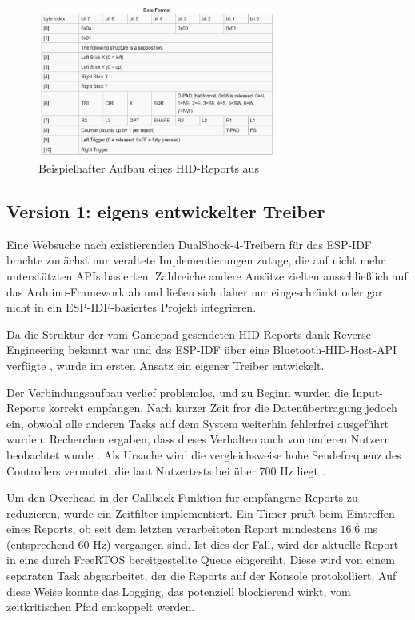 \begin{figure}[ht]
    \centering
    \includegraphics[width=0.7\textwidth]{images/becker_esp32_ds4_report.png}
    \caption{Beispielhafter Aufbau eines HID-Reports aus \cite{esp_ds4_hid_reports}}
\end{figure}

\subsection{Version 1: eigens entwickelter Treiber}

Eine Websuche nach existierenden DualShock-4-Treibern für das ESP-IDF brachte zunächst nur veraltete Implementierungen zutage, die auf nicht mehr unterstützten APIs basierten. 
Zahlreiche andere Ansätze zielten ausschließlich auf das Arduino-Framework ab und ließen sich daher nur eingeschränkt oder gar nicht in ein ESP-IDF-basiertes Projekt integrieren.

Da die Struktur der vom Gamepad gesendeten HID-Reports dank Reverse Engineering bekannt war und das ESP-IDF über eine Bluetooth-HID-Host-API verfügte \cite{esp_hib_bt_api}, wurde im ersten Ansatz ein eigener Treiber entwickelt.

Der Verbindungsaufbau verlief problemlos, und zu Beginn wurden die Input-Reports korrekt empfangen. 
Nach kurzer Zeit fror die Datenübertragung jedoch ein, obwohl alle anderen Tasks auf dem System weiterhin fehlerfrei ausgeführt wurden. 
Recherchen ergaben, dass dieses Verhalten auch von anderen Nutzern beobachtet wurde \cite{esp_hib_bt_api_issues}. 
Als Ursache wird die vergleichsweise hohe Sendefrequenz des Controllers vermutet, die laut Nutzertests bei über 700 Hz liegt \cite{esp_ds4_hid_reports}.

Um den Overhead in der Callback-Funktion für empfangene Reports zu reduzieren, wurde ein Zeitfilter implementiert. 
Ein Timer prüft beim Eintreffen eines Reports, ob seit dem letzten verarbeiteten Report mindestens $16.\overline{6}$ ms (entsprechend 60 Hz) vergangen sind. 
Ist dies der Fall, wird der aktuelle Report in eine durch FreeRTOS bereitgestellte Queue eingereiht. 
Diese wird von einem separaten Task abgearbeitet, der die Reports auf der Konsole protokolliert. 
Auf diese Weise konnte das Logging, das potenziell blockierend wirkt, vom zeitkritischen Pfad entkoppelt werden.

